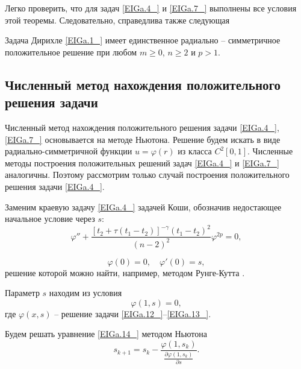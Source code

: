 Легко проверить, что для задач \eqref{EIGa.4_} и \eqref{EIGa.7_} выполнены все условия этой теоремы.
Следовательно, справедлива также следующая


\begin{theorem}\label{AbEI3.4:th2}
Задача Дирихле \eqref{EIGa.1_} имеет единственное радиально -- симметричное положительное решение при любом $m\ge 0$, $n\ge 2$ и $p>1$.
\end{theorem}


\subsection{Численный метод нахождения положительного решения задачи}

Численный метод нахождения положительного решения задачи \eqref{EIGa.4_}, \eqref{EIGa.7_} основывается на методе Ньютона. Решение будем искать в виде радиально-симметричной функции $u=\varphi \left(r\right)$ из класса $C^{2} \left[0,1\right]$. Численные методы построения положительных решений задач \eqref{EIGa.4_} и \eqref{EIGa.7_} аналогичны. Поэтому рассмотрим только случай построения положительного решения задачи \eqref{EIGa.4_}.

Заменим краевую задачу \eqref{EIGa.4_} задачей Коши, обозначив недостающее начальное условие через $s$:
\begin{equation}
\varphi''+\frac{\left[t_{2} +\tau \left(t_{1} -t_{2} \right)\right]^{-\gamma } \left(t_{1} -t_{2} \right)^{2} }{\left(n-2\right)^{2} } \varphi ^{2p} =0,         \label{EIGa.12_}
\end{equation}

\begin{equation}
\varphi \left(0\right)=0,\quad\varphi'\left(0\right)=s,\label{EIGa.13_}
\end{equation}
решение которой можно найти, например, методом Рунге-Кутта \cite{bahvalov}.

Параметр $s$ находим из условия
\begin{equation} \label{EIGa.14_} \varphi (1,s)=0, \end{equation}
где $\varphi (x,s)$ -- решение задачи \eqref{EIGa.12_}--\eqref{EIGa.13_}.

Будем решать уравнение \eqref{EIGa.14_} методом Ньютона
\begin{equation}s_{k+1} =s_{k} -\frac{\varphi \left(1,s_{k} \right)}{\frac{\partial \varphi \left(1,s_{k} \right)}{\partial s} }.         \label{EIGa.15_}\end{equation}

